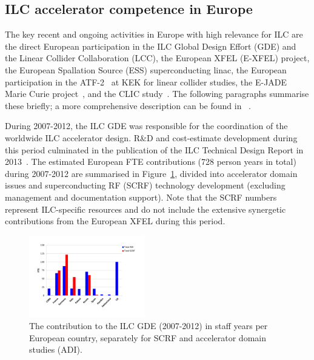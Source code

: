 \documentclass[%
 reprint,
 floatfix,
 amsmath,amssymb,
 aps,
]{revtex4-1}
\begin{document}
\subsection{ILC accelerator competence in Europe~\label{sec:acc:competence}}

The key recent and ongoing activities in Europe with high relevance for ILC are the direct European participation in the ILC Global Design Effort (GDE) and the Linear Collider Collaboration (LCC),
the European XFEL (E-XFEL) project, the European Spallation Source (ESS) superconducting linac, the European 
participation in the ATF-2~\cite{Grishanov:2005ek,Grishanov:2006kx} at KEK for linear collider studies, the E-JADE Marie 
Curie project~\cite{ejade}, and the CLIC study~\cite{Aicheler:2012bya,Linssen:2012hp}. The following paragraphs 
summarise these briefly; a more comprehensive description can be found in ~\cite{ejade-report}. 

During 2007-2012, the ILC GDE was responsible for the coordination of the worldwide ILC accelerator design. 
R\&D and cost-estimate development during this period culminated in the publication of the ILC Technical Design Report in 2013~\cite{Behnke:2013xla}. 
The estimated European FTE contributions (728 person years in total) during 2007-2012 are summarised in Figure~\ref{fig:PrePrep:ilcgde4}, 
divided into accelerator domain issues and superconducting RF (SCRF) technology development (excluding management and documentation support). 
Note that the SCRF numbers represent ILC-specific resources and do not include the extensive synergetic contributions from the European XFEL during this period.

\begin{figure}[htbp]
\includegraphics[width=0.45\textwidth]{figures/EU-GDE-FTE-columns-per-country.pdf}
\caption{\label{fig:PrePrep:ilcgde4} The contribution to the ILC GDE (2007-2012) in staff years per European country, separately for SCRF and accelerator domain studies (ADI).}
\end{figure}

\end{document}
